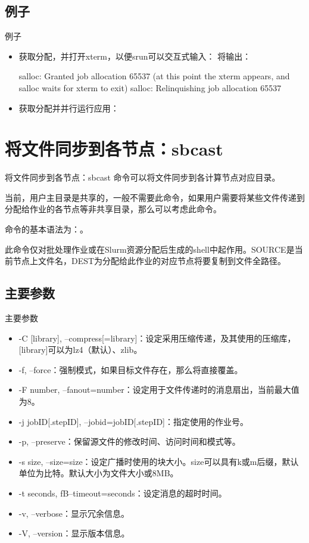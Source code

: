 \subsection{例子}
\begin{frame}[fragile]{例子}
\begin{itemize}
	\item 获取分配，并打开xterm，以便srun可以交互式输入：
将输出：
\begin{OUT}
salloc: Granted job allocation 65537
(at this point the xterm appears, and salloc waits for xterm to exit)
salloc: Relinquishing job allocation 65537
\end{OUT}
	\item 获取分配并并行运行应用：
\end{itemize}
\end{frame}

\section{将文件同步到各节点：sbcast}
\begin{frame}{将文件同步到各节点：sbcast}
命令可以将文件同步到各计算节点对应目录。

当前，用户主目录是共享的，一般不需要此命令，如果用户需要将某些文件传递到分配给作业的各节点等非共享目录，那么可以考虑此命令。

命令的基本语法为：。

此命令仅对批处理作业或在Slurm资源分配后生成的shell中起作用。SOURCE是当前节点上文件名，DEST为分配给此作业的对应节点将要复制到文件全路径。
\end{frame}

\subsection{主要参数}
\begin{frame}{主要参数}
\begin{itemize}
	\item -C [library], --compress[=library]：设定采用压缩传递，及其使用的压缩库，[library]可以为lz4（默认）、zlib。
    \item -f, --force：强制模式，如果目标文件存在，那么将直接覆盖。
    \item -F number, --fanout=number：设定用于文件传递时的消息扇出，当前最大值为8。
    \item -j jobID[.stepID], --jobid=jobID[.stepID]：指定使用的作业号。
    \item -p, --preserve：保留源文件的修改时间、访问时间和模式等。
    \item -s size, --size=size：设定广播时使用的块大小。size可以具有k或m后缀，默认单位为比特。默认大小为文件大小或8MB。
    \item -t seconds, fB--timeout=seconds：设定消息的超时时间。
    \item -v, --verbose：显示冗余信息。
    \item -V, --version：显示版本信息。
\end{itemize}
\end{frame}

